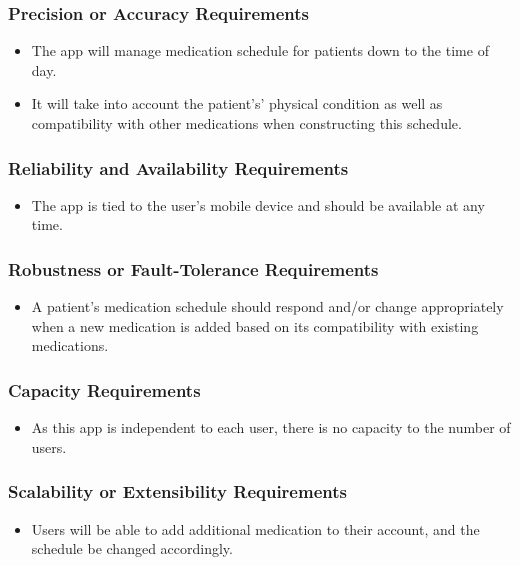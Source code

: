 \documentclass[12pt]{article}
\begin{document}
\subsubsection{Precision or Accuracy Requirements}
\begin{itemize}
\item The app will manage medication schedule for patients down to the time of day. 
\item It will take into account the patient's’ physical condition as well as compatibility with other medications when constructing this schedule.
\end{itemize}

\subsubsection{Reliability and Availability Requirements}
\begin{itemize}
\item The app is tied to the user’s mobile device and should be available at any time.
\end{itemize}

\subsubsection{Robustness or Fault-Tolerance Requirements}
\begin{itemize}
\item A patient’s medication schedule should respond and/or change appropriately when a new medication is added based on its compatibility with existing medications.
\end{itemize}

\subsubsection{Capacity Requirements}
\begin{itemize}
\item As this app is independent to each user, there is no capacity to the number of users.
\end{itemize}

\subsubsection{Scalability or Extensibility Requirements}
\begin{itemize}
\item Users will be able to add additional medication to their account, and the schedule be changed accordingly.
\end{itemize}
\end{document}
